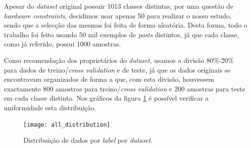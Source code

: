 Apesar do \textit{dataset} original possuir 1013 classes distintas, por uma questão de \textit{hardware constraints}, decidimos usar apenas 50 para realizar o nosso estudo, sendo que a selecção das mesmas foi feita de forma aleatória. Desta forma, todo o trabalho foi feito usando 50 mil exemplos de \textit{posts} distintos, já que cada classe, como já referido, possui 1000 amostras. 

Como recomendação dos proprietários do \textit{dataset}, usamos a divisão 80\%-20\% para dados de treino/\textit{cross validation} e de teste, já que os dados originais se encontravam organizados de forma a que, com esta divisão, houvessem exactamente 800 amostras para treino/\textit{cross validation} e 200 amostras para teste em cada classe distinta. Nos gráficos da figura \ref{fig:data_distribution} é possível verificar a uniformidade esta distribuição.


\begin{figure}[!t]
	\centering
	\texttt{[image: all\_distribution]}
	\caption{Distribuição de dados por \textit{label} por \textit{dataset}.}
	\label{fig:data_distribution}
\end{figure}

